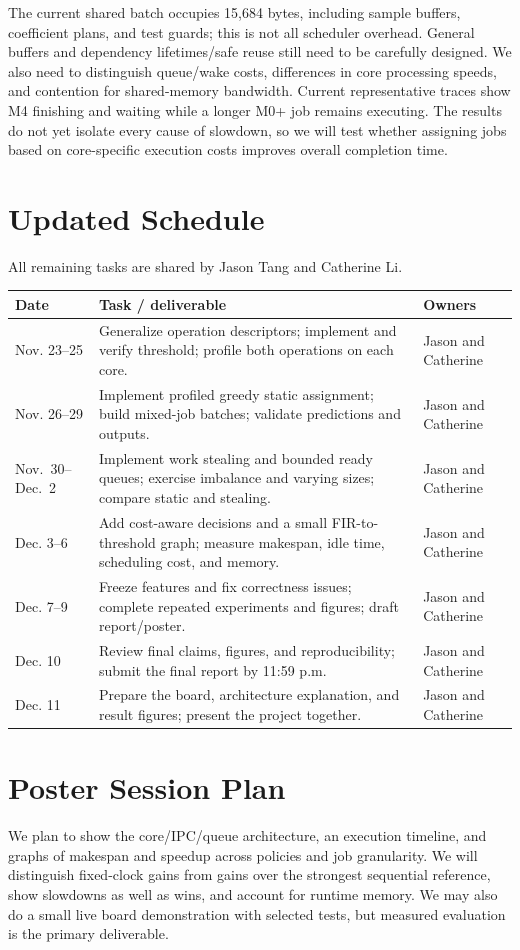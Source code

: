 \documentclass[10pt]{article}
\begin{document}
The current shared batch occupies 15,684 bytes, including sample buffers,
coefficient plans, and test guards; this is not all scheduler overhead.
General buffers and dependency lifetimes/safe reuse still need to be carefully designed. We also
need to distinguish queue/wake costs, differences in core processing speeds, and contention for shared-memory bandwidth. Current representative traces show M4 finishing and waiting while a longer M0+ job remains executing.
The results do not yet isolate every cause of slowdown, so we will test whether assigning jobs based on core-specific execution costs improves overall completion time.

\section{Updated Schedule}
All remaining tasks are shared by Jason Tang and Catherine Li.
\begin{center}
\normalsize
\begin{tabularx}{\linewidth}{@{}>{\raggedright\arraybackslash}p{1.8cm}Y>{\raggedright\arraybackslash}p{2.4cm}@{}}
\toprule
\textbf{Date} & \textbf{Task / deliverable} & \textbf{Owners} \\
\midrule
Nov. 23--25 & Generalize operation descriptors; implement and verify threshold; profile both operations on each core. & Jason and Catherine \\
Nov. 26--29 & Implement profiled greedy static assignment; build mixed-job batches; validate predictions and outputs. & Jason and Catherine \\
Nov.~30--\newline Dec.~2 & Implement work stealing and bounded ready queues; exercise imbalance and varying sizes; compare static and stealing. & Jason and Catherine \\
Dec. 3--6 & Add cost-aware decisions and a small FIR-to-threshold graph; measure makespan, idle time, scheduling cost, and memory. & Jason and Catherine \\
Dec. 7--9 & Freeze features and fix correctness issues; complete repeated experiments and figures; draft report/poster. & Jason and Catherine \\
Dec. 10 & Review final claims, figures, and reproducibility; submit the final report by 11:59 p.m. & Jason and Catherine \\
Dec. 11 & Prepare the board, architecture explanation, and result figures; present the project together. & Jason and Catherine \\
\bottomrule
\end{tabularx}
\end{center}

\section{Poster Session Plan}
We plan to show the core/IPC/queue architecture, an execution timeline,
and graphs of makespan and speedup across policies and job granularity.
We will distinguish fixed-clock gains from gains over the strongest
sequential reference, show slowdowns as well as wins, and account for
runtime memory. We may also do a small live board demonstration with selected tests, but measured evaluation is the primary deliverable.
\end{document}
